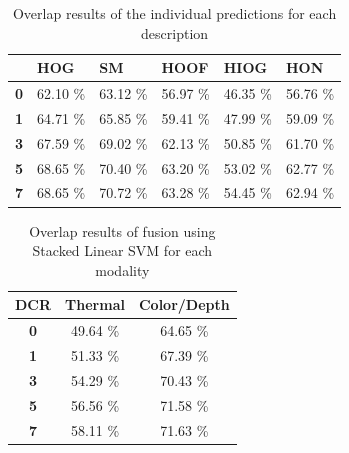 \documentclass[10pt,twocolumn,letterpaper]{article}
\begin{document}
\begin{table}[h]\footnotesize
\center
\caption{Overlap results of the individual predictions for each description}
\label{table:individual}
\begin{tabular}{|l|l|l|l|l|l|}
\hline
&\textbf{HOG}&\textbf{SM}&\textbf{HOOF}&\textbf{HIOG}&\textbf{HON}\\\hline
\textbf{0}&62.10 \% &63.12 \%&56.97 \%&46.35 \%&56.76 \%\\\hline
\textbf{1}&64.71 \%&65.85 \%&59.41 \%&47.99 \%&59.09 \%\\\hline
\textbf{3}&67.59 \%&69.02 \%&62.13 \%&50.85 \%&61.70 \%\\\hline
\textbf{5}&68.65 \%&70.40 \%&63.20 \%&53.02 \%&62.77 \%\\\hline
\textbf{7}&68.65 \%&70.72 \%&63.28 \%&54.45 \%&62.94 \%\\\hline
\end{tabular}
\end{table}


\begin{table}[h]\footnotesize
\center
\caption{Overlap results of fusion using Stacked Linear SVM for each modality}
\label{table:linearstacked}
\begin{tabular}{|c|c|c|}
\hline
\textbf{DCR}&\textbf{Thermal}&\textbf{Color/Depth}\\\hline
\textbf{0}&49.64 \%&64.65 \%\\\hline
\textbf{1}&51.33 \%&67.39 \%\\\hline
\textbf{3}&54.29 \%&70.43 \%\\\hline
\textbf{5}&56.56 \%&71.58 \%\\\hline
\textbf{7}&58.11 \%&71.63 \%\\\hline
\end{tabular}
\end{table}

\end{document}
